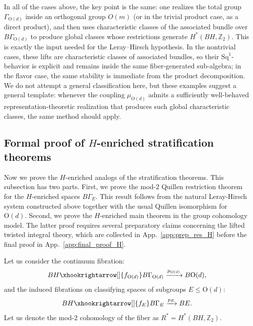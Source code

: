 \documentclass[aps,prx,reprint,superscriptaddress,twocolumn,amsmath,amssymb,amsfonts, nofootinbib]{revtex4-2}
\newcommand{\Z}{\mathbb{Z}}
\theoremstyle{apsstyle}
\begin{document}
\noindent In all of the cases above, the key point is the same: one realizes the total group $\Gamma_{\mathrm{O}(d)}$ inside an orthogonal group $O(m)$ (or in the trivial product case, as a direct product), and then uses characteristic classes of the associated bundle over $B\Gamma_{\mathrm{O}(d)}$ to produce global classes whose restrictions generate $H^{*}(BH, \Z_{2})$. This is exactly the input needed for the Leray–Hirsch hypothesis. In the nontrivial cases, these lifts are characteristic classes of associated bundles, so their $\mathrm{Sq}^{1}$-behavior is explicit and remains inside the same fiber-generated sub-algebra; in the flavor case, the same stability is immediate from the product decomposition. We do not attempt a general classification here, but these examples suggest a general template: whenever the coupling $\mu_{\mathrm{O}(d)}$
admits a sufficiently well-behaved representation-theoretic realization that produces such global characteristic classes, the same method should apply.


\subsection{Formal proof of $H$-enriched stratification theorems}
\label{app:proof_internal}

Now we prove the $H$-enriched analogs of the stratification theorems. This subsection has two parts. First, we prove the mod-$2$ Quillen restriction theorem for the $H$-enriched spaces $B\Gamma_E$. This result follows from the natural Leray-Hirsch system constructed above together with the usual Quillen isomorphism for $\mathrm{O}(d)$. Second, we prove the $H$-enriched main theorem in the group cohomology model. The latter proof requires several preparatory claims concerning the lifted twisted integral theory, which are collected in App.~\ref{app:prep_res_H} before the final proof in App.~\ref{app:final_proof_H}.

\bigskip 

\noindent Let us consider the continuum fibration:
\begin{equation*}
    BH \xhookrightarrow[]{f_{\mathrm{O}(d)}} B\Gamma_{\mathrm{O}(d)} \xrightarrow[]{p_{\mathrm{O}(d)}} B\mathrm{O}(d),
\end{equation*}
and the induced fibrations on classifying spaces of subgroups $E\leq \mathrm{O}(d)$:
\begin{equation*}
    BH \xhookrightarrow[]{f_{E}} B\Gamma_{E} \xrightarrow[]{p_{E}} BE.
\end{equation*}
Let us denote the mod-$2$ cohomology of the fiber as $R^{*}=H^{*}(BH,\Z_{2})$. 
\end{document}

